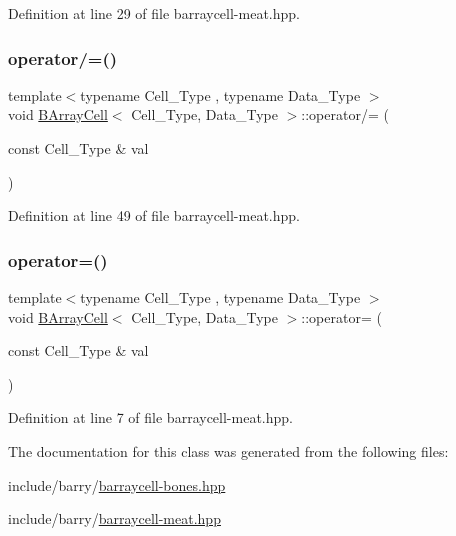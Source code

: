 Definition at line 29 of file barraycell-\/meat.\+hpp.

\mbox{\label{class_b_array_cell_aa5debb920d8ffc246e7d463ac8e26152}} 
\subsubsection{\texorpdfstring{operator/=()}{operator/=()}}
{\footnotesize\ttfamily template$<$typename Cell\+\_\+\+Type , typename Data\+\_\+\+Type $>$ \\
void \hyperlink{class_b_array_cell}{B\+Array\+Cell}$<$ Cell\+\_\+\+Type, Data\+\_\+\+Type $>$\+::operator/= (\begin{DoxyParamCaption}\item[{const Cell\+\_\+\+Type \&}]{val }\end{DoxyParamCaption})\hspace{0.3cm}{\ttfamily [inline]}}



Definition at line 49 of file barraycell-\/meat.\+hpp.

\mbox{\label{class_b_array_cell_ad20091ef5961aed4241bd8d0b6d5dd0d}} 
\subsubsection{\texorpdfstring{operator=()}{operator=()}}
{\footnotesize\ttfamily template$<$typename Cell\+\_\+\+Type , typename Data\+\_\+\+Type $>$ \\
void \hyperlink{class_b_array_cell}{B\+Array\+Cell}$<$ Cell\+\_\+\+Type, Data\+\_\+\+Type $>$\+::operator= (\begin{DoxyParamCaption}\item[{const Cell\+\_\+\+Type \&}]{val }\end{DoxyParamCaption})\hspace{0.3cm}{\ttfamily [inline]}}



Definition at line 7 of file barraycell-\/meat.\+hpp.



The documentation for this class was generated from the following files\+:\begin{DoxyCompactItemize}
\item 
include/barry/\hyperlink{barraycell-bones_8hpp}{barraycell-\/bones.\+hpp}\item 
include/barry/\hyperlink{barraycell-meat_8hpp}{barraycell-\/meat.\+hpp}\end{DoxyCompactItemize}
